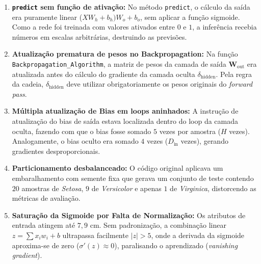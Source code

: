 \documentclass[twocolumn]{article}
\begin{document}
\begin{enumerate}
    \item \textbf{\texttt{predict} sem função de ativação:} No método \texttt{predict}, o cálculo da saída era puramente linear ($X W_h + b_h) W_o + b_o$, sem aplicar a função sigmoide. Como a rede foi treinada com valores ativados entre $0$ e $1$, a inferência recebia números em escalas arbitrárias, destruindo as previsões.
    \item \textbf{Atualização prematura de pesos no Backpropagation:} Na função \texttt{Backpropagation\_Algorithm}, a matriz de pesos da camada de saída $\mathbf{W}_{\text{out}}$ era atualizada antes do cálculo do gradiente da camada oculta $\delta_{\text{hidden}}$. Pela regra da cadeia, $\delta_{\text{hidden}}$ deve utilizar obrigatoriamente os pesos originais do \textit{forward pass}.
    \item \textbf{Múltipla atualização de Bias em loops aninhados:} A instrução de atualização do bias de saída estava localizada dentro do loop da camada oculta, fazendo com que o bias fosse somado $5$ vezes por amostra ($H$ vezes). Analogamente, o bias oculto era somado $4$ vezes ($D_{\text{in}}$ vezes), gerando gradientes desproporcionais.
    \item \textbf{Particionamento desbalanceado:} O código original aplicava um embaralhamento com semente fixa que gerava um conjunto de teste contendo $20$ amostras de \textit{Setosa}, $9$ de \textit{Versicolor} e apenas $1$ de \textit{Virginica}, distorcendo as métricas de avaliação.
    \item \textbf{Saturação da Sigmoide por Falta de Normalização:} Os atributos de entrada atingem até $7{,}9$ cm. Sem padronização, a combinação linear $z = \sum x_i w_i + b$ ultrapassa facilmente $|z| > 5$, onde a derivada da sigmoide aproxima-se de zero ($\sigma'(z) \approx 0$), paralisando o aprendizado (\textit{vanishing gradient}).
\end{enumerate}
\end{document}
